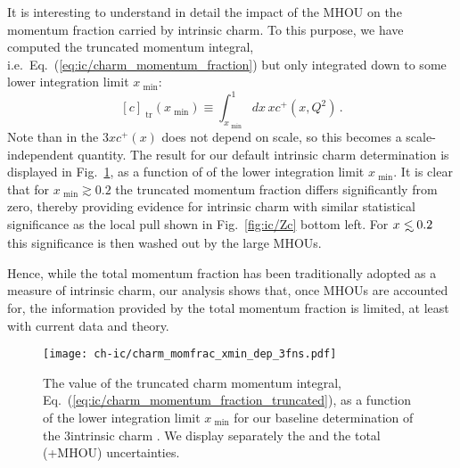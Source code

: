 It is interesting to understand in detail the impact of the MHOU on
the momentum fraction carried by intrinsic charm. To this purpose, we
have computed  the truncated momentum integral, i.e.\ 
  Eq.~(\ref{eq:ic/charm_momentum_fraction}) but only integrated down to
  some  lower
  integration limit $x_\textrm{ min}$:
  \begin{equation}
\label{eq:ic/charm_momentum_fraction_truncated}
\left[ c\right]_\textrm{ tr}(x_\textrm{ min}) \equiv \int_{x_\textrm{ min}}^1dx\, x c^+(x,Q^2) \, .
\end{equation}
Note than in the 3\fns   $x
c^+(x)$ does not depend on scale, so  this becomes
a scale-independent quantity.
%
The result for our default intrinsic charm determination is displayed
in Fig.~\ref{fig:ic/charm_momfrac_xmin_dep}, as a function of
of the lower integration limit $x_\textrm{ min}$.
%
It is clear that for $x_\textrm{ min} \gtrsim 0.2$ the truncated momentum
fraction  differs significantly from zero, thereby providing evidence
for intrinsic charm with similar statistical  significance as the
local pull shown in Fig.~\ref{fig:ic/Zc} bottom left.
%
For $x \lsim 0.2$
this  significance is then washed out
by the large MHOUs.

Hence, while the total momentum fraction has been traditionally adopted
as a measure of intrinsic charm, 
our analysis shows that, once MHOUs are accounted for, the information
provided by the total momentum fraction is limited, at least with
current data and theory.



\begin{figure}[h!]
  \begin{center}
    \texttt{[image: ch-ic/charm\_momfrac\_xmin\_dep\_3fns.pdf]}
    \caption{\small The value of the truncated charm momentum integral,
      Eq.~(\ref{eq:ic/charm_momentum_fraction_truncated}), as a function
      of the lower integration limit $x_\textrm{ min}$
      for our baseline determination of the 3\fns intrinsic charm \pdf.
      We display separately the \pdf and the total (\pdf+MHOU) uncertainties.
  \label{fig:ic/charm_momfrac_xmin_dep} }
\end{center}
\end{figure}
